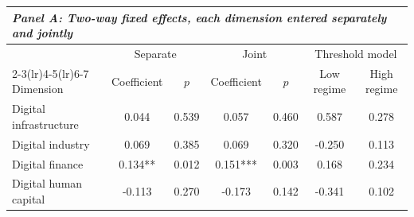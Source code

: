 \begin{tabular}{lcccccc}
\toprule
\multicolumn{7}{l}{\textit{Panel A: Two-way fixed effects, each dimension entered separately and jointly}} \\
\midrule
 & \multicolumn{2}{c}{Separate} & \multicolumn{2}{c}{Joint} & \multicolumn{2}{c}{Threshold model} \\
\cmidrule(lr){2-3}\cmidrule(lr){4-5}\cmidrule(lr){6-7}
Dimension & Coefficient & $p$ & Coefficient & $p$ & Low regime & High regime \\
\midrule
Digital infrastructure & 0.044 & 0.539 & 0.057 & 0.460 & 0.587 & 0.278 \\
Digital industry & 0.069 & 0.385 & 0.069 & 0.320 & -0.250 & 0.113 \\
Digital finance & 0.134** & 0.012 & 0.151*** & 0.003 & 0.168 & 0.234 \\
Digital human capital & -0.113 & 0.270 & -0.173 & 0.142 & -0.341 & 0.102 \\
\bottomrule
\end{tabular}